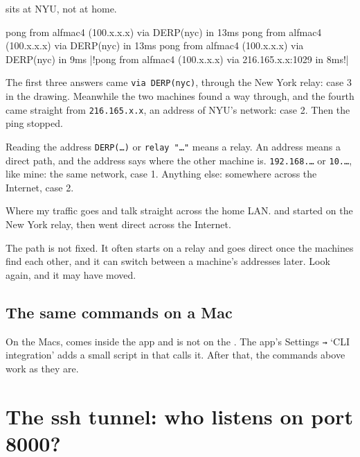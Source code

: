 \documentclass[11pt,a4paper]{article}
\begin{document}
 sits at NYU, not at home.

\begin{cmdout}
pong from alfmac4 (100.x.x.x) via DERP(nyc) in 13ms
pong from alfmac4 (100.x.x.x) via DERP(nyc) in 13ms
pong from alfmac4 (100.x.x.x) via DERP(nyc) in 9ms
|!pong from alfmac4 (100.x.x.x) via 216.165.x.x:1029 in 8ms!|
\end{cmdout}

The first three answers came \texttt{via DERP(nyc)}, through the New York relay: case 3 in the drawing. Meanwhile the two machines found a way through, and the fourth came straight from \texttt{216.165.x.x}, an address of NYU's network: case 2. Then the ping stopped.

\begin{insight}{Reading the address}
\texttt{DERP(\ldots)} or \texttt{relay "\ldots"} means a relay. An address means a direct path, and the address says where the other machine is. \texttt{192.168.\ldots} or \texttt{10.\ldots}, like mine: the same network, case 1. Anything else: somewhere across the Internet, case 2.
\end{insight}

\begin{result}{Where my traffic goes}
 and  talk straight across the home LAN.  and  started on the New York relay, then went direct across the Internet.
\end{result}

The path is not fixed. It often starts on a relay and goes direct once the machines find each other, and it can switch between a machine's addresses later. Look again, and it may have moved.

\subsection*{The same commands on a Mac}

On the Macs,  comes inside the app and is not on the . The app's Settings \texttt{→} ‘CLI integration’ adds a small  script in  that calls it. After that, the commands above work as they are.

\section{The ssh tunnel: who listens on port 8000?}
\end{document}

